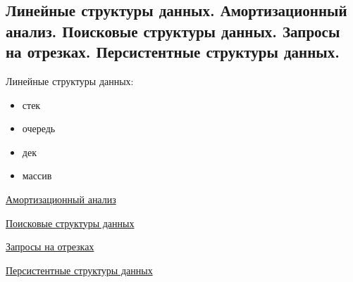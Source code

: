 \subsection{Линейные структуры данных. Амортизационный анализ. Поисковые структуры данных. Запросы на отрезках. Персистентные структуры данных.}

Линейные структуры данных:
\begin{itemize}
    \item стек
    \item очередь
    \item дек
    \item массив
\end{itemize}

\href{https://neerc.ifmo.ru/wiki/index.php?title=%D0%90%D0%BC%D0%BE%D1%80%D1%82%D0%B8%D0%B7%D0%B0%D1%86%D0%B8%D0%BE%D0%BD%D0%BD%D1%8B%D0%B9_%D0%B0%D0%BD%D0%B0%D0%BB%D0%B8%D0%B7}{Амортизационный анализ}

\href{https://neerc.ifmo.ru/wiki/index.php?title=%D0%9F%D0%BE%D0%B8%D1%81%D0%BA%D0%BE%D0%B2%D1%8B%D0%B5_%D1%81%D1%82%D1%80%D1%83%D0%BA%D1%82%D1%83%D1%80%D1%8B_%D0%B4%D0%B0%D0%BD%D0%BD%D1%8B%D1%85}{Поисковые структуры данных}

\href{https://e-maxx.ru/algo/segment_tree}{Запросы на отрезках}

\href{https://neerc.ifmo.ru/wiki/index.php?title=%D0%9F%D0%B5%D1%80%D1%81%D0%B8%D1%81%D1%82%D0%B5%D0%BD%D1%82%D0%BD%D1%8B%D0%B5_%D1%81%D1%82%D1%80%D1%83%D0%BA%D1%82%D1%83%D1%80%D1%8B_%D0%B4%D0%B0%D0%BD%D0%BD%D1%8B%D1%85}{Персистентные структуры данных}